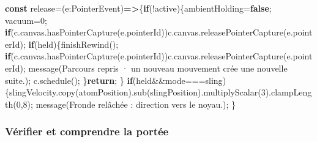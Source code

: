\documentclass[
  canadien,
  11pt,
  letterpaper,
]{article}
\newenvironment{Shaded}{}{}
\newcommand{\AttributeTok}[1]{\textcolor[rgb]{0.49,0.56,0.16}{#1}}
\newcommand{\BuiltInTok}[1]{\textcolor[rgb]{0.00,0.50,0.00}{#1}}
\newcommand{\ControlFlowTok}[1]{\textcolor[rgb]{0.00,0.44,0.13}{\textbf{#1}}}
\newcommand{\DecValTok}[1]{\textcolor[rgb]{0.25,0.63,0.44}{#1}}
\newcommand{\FunctionTok}[1]{\textcolor[rgb]{0.02,0.16,0.49}{#1}}
\newcommand{\KeywordTok}[1]{\textcolor[rgb]{0.00,0.44,0.13}{\textbf{#1}}}
\newcommand{\NormalTok}[1]{#1}
\newcommand{\OperatorTok}[1]{\textcolor[rgb]{0.40,0.40,0.40}{#1}}
\newcommand{\StringTok}[1]{\textcolor[rgb]{0.25,0.44,0.63}{#1}}
\begin{document}
\begin{Shaded}
\begin{Highlighting}[]
\KeywordTok{const}\NormalTok{ release}\OperatorTok{=}\NormalTok{(e}\OperatorTok{:}\BuiltInTok{PointerEvent}\NormalTok{)}\KeywordTok{=\textgreater{}}\NormalTok{\{}\ControlFlowTok{if}\NormalTok{(}\OperatorTok{!}\NormalTok{active)\{ambientHolding}\OperatorTok{=}\KeywordTok{false}\OperatorTok{;}
\NormalTok{vacuum}\OperatorTok{=}\DecValTok{0}\OperatorTok{;}
\ControlFlowTok{if}\NormalTok{(c}\OperatorTok{.}\AttributeTok{canvas}\OperatorTok{.}\FunctionTok{hasPointerCapture}\NormalTok{(e}\OperatorTok{.}\AttributeTok{pointerId}\NormalTok{))c}\OperatorTok{.}\AttributeTok{canvas}\OperatorTok{.}\FunctionTok{releasePointerCapture}\NormalTok{(e}\OperatorTok{.}\AttributeTok{pointerId}\NormalTok{)}\OperatorTok{;}
\ControlFlowTok{if}\NormalTok{(held)\{}\FunctionTok{finishRewind}\NormalTok{()}\OperatorTok{;}
\ControlFlowTok{if}\NormalTok{(c}\OperatorTok{.}\AttributeTok{canvas}\OperatorTok{.}\FunctionTok{hasPointerCapture}\NormalTok{(e}\OperatorTok{.}\AttributeTok{pointerId}\NormalTok{))c}\OperatorTok{.}\AttributeTok{canvas}\OperatorTok{.}\FunctionTok{releasePointerCapture}\NormalTok{(e}\OperatorTok{.}\AttributeTok{pointerId}\NormalTok{)}\OperatorTok{;}
\FunctionTok{message}\NormalTok{(}\StringTok{\textquotesingle{}Parcours repris · un nouveau mouvement crée une nouvelle suite.\textquotesingle{}}\NormalTok{)}\OperatorTok{;}
\NormalTok{c}\OperatorTok{.}\FunctionTok{schedule}\NormalTok{()}\OperatorTok{;}
\NormalTok{\}}\ControlFlowTok{return}\OperatorTok{;}
\NormalTok{\}}
\ControlFlowTok{if}\NormalTok{(held}\OperatorTok{\&\&}\NormalTok{mode}\OperatorTok{===}\StringTok{\textquotesingle{}sling\textquotesingle{}}\NormalTok{)\{slingVelocity}\OperatorTok{.}\FunctionTok{copy}\NormalTok{(atomPosition)}\OperatorTok{.}\FunctionTok{sub}\NormalTok{(slingPosition)}\OperatorTok{.}\FunctionTok{multiplyScalar}\NormalTok{(}\DecValTok{3}\NormalTok{)}\OperatorTok{.}\FunctionTok{clampLength}\NormalTok{(}\DecValTok{0}\OperatorTok{,}\DecValTok{8}\NormalTok{)}\OperatorTok{;}
\FunctionTok{message}\NormalTok{(}\StringTok{\textquotesingle{}Fronde relâchée : direction vers le noyau.\textquotesingle{}}\NormalTok{)}\OperatorTok{;}
\NormalTok{\}}
\end{Highlighting}
\end{Shaded}

\subsubsection{Vérifier et comprendre la
portée}\label{vuxe9rifier-et-comprendre-la-portuxe9e}
\end{document}
